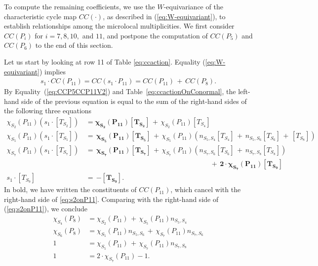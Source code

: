 \documentclass[a4paper, 11pt]{article}
\begin{document}
To compute the remaining coefficients, we use the $W$-equivariance of
the characteristic cycle map $CC(\cdot)$, as described in
(\ref{eq:W-equivariant}), to establish relationships among the
microlocal multiplicities. We first consider $CC(P_i)$ for $i = 7, 8,
10,$ and $11$, and postpone the computation of $CC(P_5)$ and $CC(P_6)$
to the end of this section. 

Let us start by looking at row 11 of Table \ref{eq:ccaction}. 
Equality (\ref{eq:W-equivariant}) implies
\begin{align}\label{eq:s2onP11}
s_{1}\cdot CC(P_{11})=
CC(s_{1}\cdot P_{11})
=CC(P_{11})\, +\, CC(P_8).
\end{align}
By Equality~(\ref{eq:CCP5CCP11V2}) and Table~\ref{eq:ccactionOnConormal}, the left-hand side of the previous equation is 
equal to the sum of the right-hand sides of the following three equations
\begin{align*}
  \chi_{S_2}^{\mathrm{}}(P_{11})(s_{1}\cdot[T_{S_2}])&=\mathbf{\chi_{S_2}^{}(P_{11})[T_{S_2}]}\, +\,  \chi_{S_2}^{}(P_{11})[T_{S_4}]\nonumber\\
\chi_{S_5}^{}(P_{11})(s_{1}\cdot[T_{S_5}])\, &=\, \mathbf{\chi_{S_5}^{}(P_{11})[T_{S_5}]}\, +\,  \chi_{S_5}^{}(P_{11}) \left(n_{S_5,S_4}[T_{S_4}]\, +\, \nonumber
n_{S_5,S_6}[T_{S_6}]\, +\, [T_{S_8}]\right)\\%
 \chi_{S_7}^{}(P_{11})(s_{1}\cdot [T_{S_7}])\, &=\,  \mathbf{\chi_{S_7}^{}(P_{11})
[T_{S_7}]}\, +\,  \chi_{S_7}^{}(P_{11})\left(n_{S_7,S_6}[T_{S_6}]\, +\, n_{S_7,S_8} [T_{S_8}]\right)\\ 
&\qquad\qquad\qquad\qquad\qquad\qquad\qquad\qquad\qquad +\, \mathbf{2\cdot\chi_{S_7}^{}(P_{11}) [T_{S_9}]}\\
s_{1}\cdot [T_{S_9}]\, &=\, \mathbf{-[T_{S_9}]}.\nonumber
\end{align*}
In bold, we have written the constituents of $CC(P_{11})$, which
cancel with the right-hand side of \eqref{eq:s2onP11}. 
Comparing with the right-hand side of (\ref{eq:s2onP11}), we conclude 
\begin{align}
\chi^{}_{S_4}(P_{8})&=\chi^{}_{S_2}(P_{11})
\, +\, \chi^{}_{S_5}(P_{11})n_{S_5,S_4}\label{eq:S11S8a} \\
\chi^{}_{S_6}(P_{8})&=
\chi^{}_{S_5}(P_{11}) n_{S_5,S_6}
\, +\, 
\chi^{}_{S_7}(P_{11})n_{S_7,S_6} \label{eq:S11S8b}\\
1&=\chi^{}_{S_5}(P_{11})%
\,  +\,   \chi^{}_{S_7}(P_{11})n_{S_7,S_8}\label{eq:S11S8c} \\
1&=2\cdot \chi^{}_{S_7}(P_{11})-1.\label{eq:S11S8d} 
\end{align}
\end{document}
